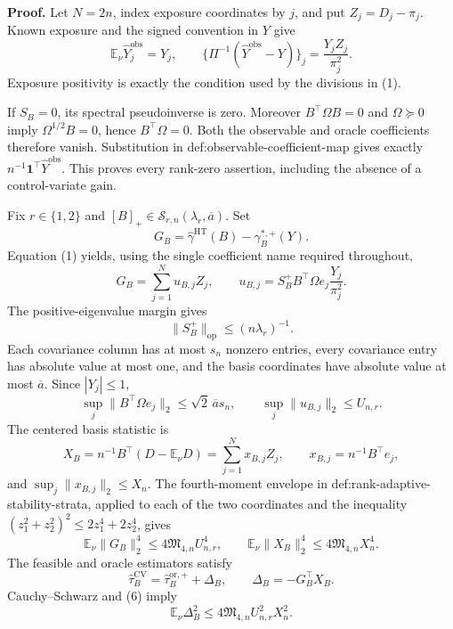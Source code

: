 \textbf{Proof.}
Let \(N=2n\), index exposure coordinates by \(j\), and put \(Z_j=D_j-\pi_j\).  Known exposure and the signed convention in \(Y\) give
\[
\mathbb E_\nu\widehat Y_j^{\mathrm{obs}}=Y_j,
\qquad
\{\Pi^{-1}(\widehat Y^{\mathrm{obs}}-Y)\}_j
=\frac{Y_jZ_j}{\pi_j^2}.
\tag{1}
\]
Exposure positivity is exactly the condition used by the divisions in (1).

If \(S_B=0\), its spectral pseudoinverse is zero.  Moreover \(B^{\top}\Omega B=0\) and \(\Omega\succeq0\) imply \(\Omega^{1/2}B=0\), hence \(B^{\top}\Omega=0\).  Both the observable and oracle coefficients therefore vanish.  Substitution in def:observable-coefficient-map gives exactly \(n^{-1}\mathbf1^{\top}\widehat Y^{\mathrm{obs}}\).  This proves every rank-zero assertion, including the absence of a control-variate gain.

Fix \(r\in\{1,2\}\) and \([B]_+\in\mathcal S_{r,n}(\lambda_r,\overline a)\).  Set
\[
G_B=\widehat\gamma^{\mathrm{HT}}(B)-\gamma_B^{*,+}(Y).
\]
Equation (1) yields, using the single coefficient name required throughout,
\[
G_B=\sum_{j=1}^{N}u_{B,j}Z_j,
\qquad
u_{B,j}=S_B^+B^{\top}\Omega e_j\frac{Y_j}{\pi_j^2}.
\tag{2}
\]
The positive-eigenvalue margin gives
\[
\lVert S_B^+\rVert_{\mathrm{op}}\le(n\lambda_r)^{-1}.
\tag{3}
\]
Each covariance column has at most \(s_n\) nonzero entries, every covariance entry has absolute value at most one, and the basis coordinates have absolute value at most \(\overline a\).  Since \(|Y_j|\le1\),
\[
\sup_j\lVert B^{\top}\Omega e_j\rVert_2
\le\sqrt2\,\overline a s_n,
\qquad
\sup_j\lVert u_{B,j}\rVert_2\le U_{n,r}.
\tag{4}
\]
The centered basis statistic is
\[
X_B=n^{-1}B^{\top}(D-\mathbb E_\nu D)
=\sum_{j=1}^{N}x_{B,j}Z_j,
\qquad
x_{B,j}=n^{-1}B^{\top}e_j,
\tag{5}
\]
and \(\sup_j\lVert x_{B,j}\rVert_2\le X_n\).  The fourth-moment envelope in def:rank-adaptive-stability-strata, applied to each of the two coordinates and the inequality \((z_1^2+z_2^2)^2\le2z_1^4+2z_2^4\), gives
\[
\mathbb E_\nu\lVert G_B\rVert_2^4
\le4\mathfrak M_{4,n}U_{n,r}^4,
\qquad
\mathbb E_\nu\lVert X_B\rVert_2^4
\le4\mathfrak M_{4,n}X_n^4.
\tag{6}
\]
The feasible and oracle estimators satisfy
\[
\widehat\tau_B^{\mathrm{CV}}
=\widehat\tau_B^{\mathrm{or},+}+\Delta_B,
\qquad
\Delta_B=-G_B^{\top}X_B.
\tag{7}
\]
Cauchy--Schwarz and (6) imply
\[
\mathbb E_\nu\Delta_B^2
\le4\mathfrak M_{4,n}U_{n,r}^2X_n^2.
\tag{8}
\]

